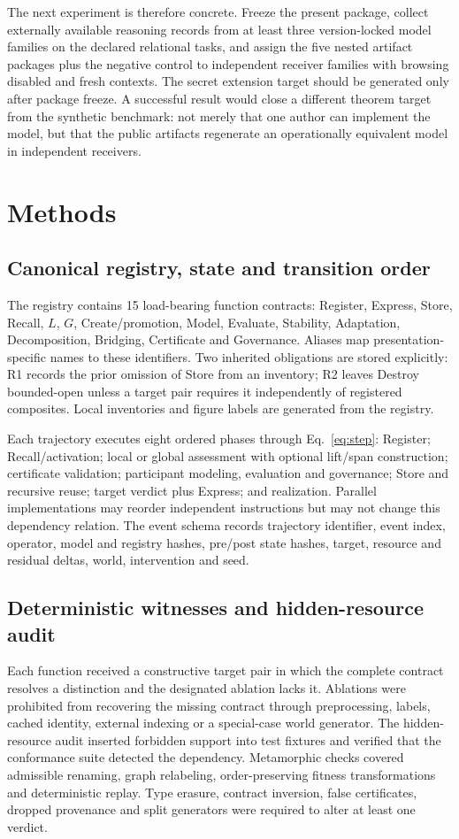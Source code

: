 \documentclass[10pt]{article}
\begin{document}
The next experiment is therefore concrete. Freeze the present package, collect externally available reasoning records from at least three version-locked model families on the declared relational tasks, and assign the five nested artifact packages plus the negative control to independent receiver families with browsing disabled and fresh contexts. The secret extension target should be generated only after package freeze. A successful result would close a different theorem target from the synthetic benchmark: not merely that one author can implement the model, but that the public artifacts regenerate an operationally equivalent model in independent receivers.

\section*{Methods}

\subsection*{Canonical registry, state and transition order}
The registry contains 15 load-bearing function contracts: Register, Express, Store, Recall, $L$, $G$, Create/promotion, Model, Evaluate, Stability, Adaptation, Decomposition, Bridging, Certificate and Governance. Aliases map presentation-specific names to these identifiers. Two inherited obligations are stored explicitly: R1 records the prior omission of Store from an inventory; R2 leaves Destroy bounded-open unless a target pair requires it independently of registered composites. Local inventories and figure labels are generated from the registry.

Each trajectory executes eight ordered phases through Eq.~\ref{eq:step}: Register; Recall/activation; local or global assessment with optional lift/span construction; certificate validation; participant modeling, evaluation and governance; Store and recursive reuse; target verdict plus Express; and realization. Parallel implementations may reorder independent instructions but may not change this dependency relation. The event schema records trajectory identifier, event index, operator, model and registry hashes, pre/post state hashes, target, resource and residual deltas, world, intervention and seed.

\subsection*{Deterministic witnesses and hidden-resource audit}
Each function received a constructive target pair in which the complete contract resolves a distinction and the designated ablation lacks it. Ablations were prohibited from recovering the missing contract through preprocessing, labels, cached identity, external indexing or a special-case world generator. The hidden-resource audit inserted forbidden support into test fixtures and verified that the conformance suite detected the dependency. Metamorphic checks covered admissible renaming, graph relabeling, order-preserving fitness transformations and deterministic replay. Type erasure, contract inversion, false certificates, dropped provenance and split generators were required to alter at least one verdict.
\end{document}
